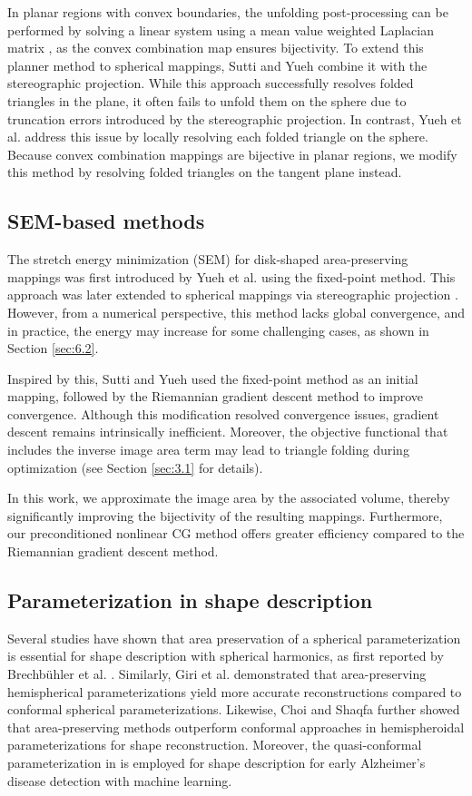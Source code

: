 \documentclass{article}
\numberwithin{equation}{section}
\begin{document}
In planar regions with convex boundaries, the unfolding post-processing can be performed by solving a linear system \cite{Yueh23} using a mean value weighted Laplacian matrix \cite{Floa03b}, as the convex combination map ensures bijectivity. To extend this planner method to spherical mappings, Sutti and Yueh \cite{SuYu24} combine it with the stereographic projection. While this approach successfully resolves folded triangles in the plane, it often fails to unfold them on the sphere due to truncation errors introduced by the stereographic projection. In contrast, Yueh et al. \cite{YuLL19} address this issue by locally resolving each folded triangle on the sphere. Because convex combination mappings are bijective in planar regions, we modify this method by resolving folded triangles on the tangent plane instead.

\subsection{SEM-based methods}
The stretch energy minimization (SEM) for disk-shaped area-preserving mappings was first introduced by Yueh et al. \cite{YuLW19} using the fixed-point method. This approach was later extended to spherical mappings via stereographic projection \cite{YuLL19}. However, from a numerical perspective, this method lacks global convergence, and in practice, the energy may increase for some challenging cases, as shown in Section \ref{sec:6.2}.

Inspired by this, Sutti and Yueh \cite{SuYu24} used the fixed-point method \cite{YuLL19} as an initial mapping, followed by the Riemannian gradient descent method to improve convergence. Although this modification resolved convergence issues, gradient descent remains intrinsically inefficient. Moreover, the objective functional that includes the inverse image area term may lead to triangle folding during optimization (see Section \ref{sec:3.1} for details).

In this work, we approximate the image area by the associated volume, thereby significantly improving the bijectivity of the resulting mappings. Furthermore, our preconditioned nonlinear CG method offers greater efficiency compared to the Riemannian gradient descent method.

\subsection{Parameterization in shape description}
Several studies have shown that area preservation of a spherical parameterization is essential for shape description with spherical harmonics, as first reported by  Brechb\"uhler et al. \cite{BrGK95}.
Similarly, Giri et al. \cite{GiCK21} demonstrated that area-preserving hemispherical parameterizations yield more accurate reconstructions compared to conformal spherical parameterizations. Likewise, Choi and Shaqfa \cite{ChSh25} further showed that area-preserving methods outperform conformal approaches in hemispheroidal parameterizations for shape reconstruction. 
{ Moreover, the quasi-conformal parameterization in \cite{ChLS20} is employed for shape description for early Alzheimer's disease detection with machine learning.}
\end{document}
